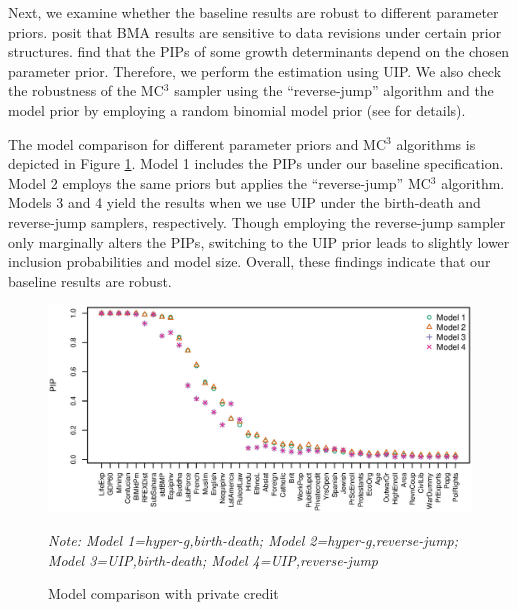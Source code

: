 \begin{refsection}
Next, we examine whether the baseline results are robust to different parameter priors. \textcite{CicconeJarocinski2010} posit that \ac{BMA} results are sensitive to data revisions under certain prior structures. \textcite{Eicheretal2011} find that the \acp{PIP} of some growth determinants depend on the chosen parameter prior. Therefore, we perform the estimation using \ac{UIP}. We also check the robustness of the MC$^{3}$ sampler using the ``reverse-jump'' algorithm and the model prior by employing a random binomial model prior (see \textcite{Zeugner2011} for details).

The model comparison for different parameter priors and MC$^{3}$ algorithms is depicted in Figure \ref{ch2fig:compPC}. Model 1 includes the \acp{PIP} under our baseline specification. Model 2 employs the same priors but applies the ``reverse-jump'' MC$^{3}$ algorithm. Models 3 and 4 yield the results when we use \ac{UIP} under the birth-death and reverse-jump samplers, respectively. Though employing the reverse-jump sampler only marginally alters the \acp{PIP}, switching to the \ac{UIP} prior leads to slightly lower inclusion probabilities and model size. Overall, these findings indicate that our baseline results are robust.

% 
\begin{figure}[!ht]
		\centering
		\caption{Model comparison with private credit}
		\label{ch2fig:compPC}
		\includegraphics[width=\linewidth]{Figures/ch2/plotCompPC6011}
	 \begin{minipage}{0.8\textwidth}
		\footnotesize
		\emph{Note: Model 1=hyper-g,birth-death; Model 2=hyper-g,reverse-jump; Model 3=\ac{UIP},birth-death; Model 4=\ac{UIP},reverse-jump}
	  \end{minipage}
\end{figure}
%


\end{refsection}
